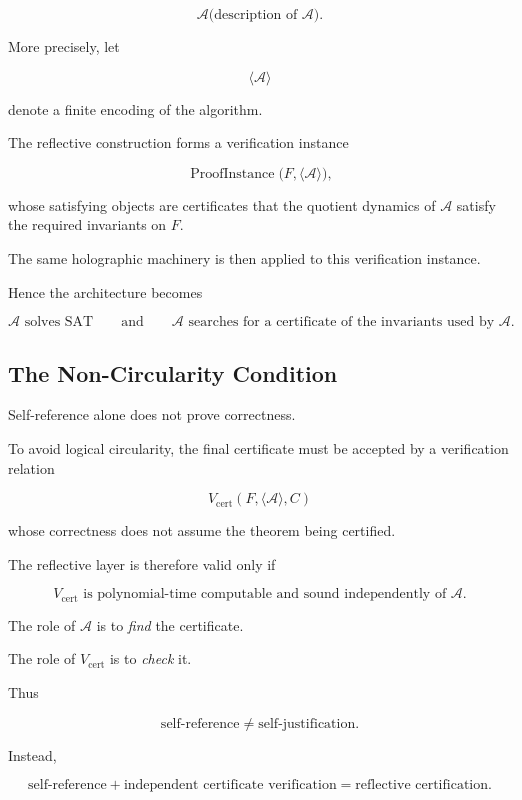 \documentclass[11pt]{article}
\theoremstyle{plain}
\theoremstyle{definition}
\begin{document}
\[
\boxed{
\mathcal{A}
\bigl(
    \text{description of }\mathcal{A}
\bigr).
}
\]

More precisely, let

\[
    \langle\mathcal{A}\rangle
\]

denote a finite encoding of the algorithm.

The reflective construction forms a verification instance

\[
    \operatorname{ProofInstance}
    \bigl(
        F,
        \langle\mathcal{A}\rangle
    \bigr),
\]

whose satisfying objects are certificates that the quotient dynamics of
\(\mathcal{A}\) satisfy the required invariants on \(F\).

The same holographic machinery is then applied to this verification instance.

Hence the architecture becomes

\[
\boxed{
\mathcal{A}
\text{ solves SAT}
\qquad\text{and}\qquad
\mathcal{A}
\text{ searches for a certificate of the invariants used by }\mathcal{A}.
}
\]

\subsection{The Non-Circularity Condition}

Self-reference alone does not prove correctness.

To avoid logical circularity, the final certificate must be accepted by a
verification relation

\[
    V_{\mathrm{cert}}
    (F,\langle\mathcal{A}\rangle,C)
\]

whose correctness does not assume the theorem being certified.

The reflective layer is therefore valid only if

\[
\boxed{
V_{\mathrm{cert}}
\text{ is polynomial-time computable and sound independently of }
\mathcal{A}.
}
\]

The role of \(\mathcal{A}\) is to \emph{find} the certificate.

The role of \(V_{\mathrm{cert}}\) is to \emph{check} it.

Thus

\[
\text{self-reference}
\neq
\text{self-justification}.
\]

Instead,

\[
\boxed{
\text{self-reference}
+
\text{independent certificate verification}
=
\text{reflective certification}.
}
\]
\end{document}
